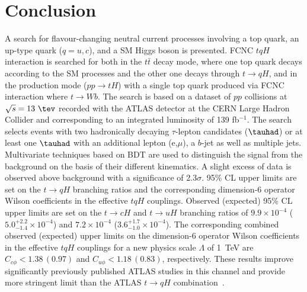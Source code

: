 \section{Conclusion}
\label{sec:conclusion}
A search for flavour-changing neutral current processes involving a top quark, an up-type quark ($q=u, c$), and a SM Higgs boson is presented. FCNC $tqH$ interaction is searched for both in the $t\bar{t}$ decay mode, where one top quark decays according to the SM processes and the other one decays through $t\rightarrow qH$, and in the production mode ($pp\rightarrow tH$) with a single top quark produced via FCNC interaction where $t\to Wb$. The search is based on a dataset of $pp$ collisions at $\sqrt{s}=13~\tev$ recorded with the ATLAS detector at the CERN Large Hadron Collider and corresponding to an integrated luminosity of 139 fb$^{-1}$. The search selects events with two hadronically decaying $\tau$-lepton candidates ($\tauhad$) or at least one $\tauhad$ with an additional lepton (e,$\mu$), a $b$-jet as well as multiple jets. Multivariate techniques based on BDT are used to distinguish the signal from the background on the basis of their different kinematics.
A slight excess of data is observed above background with a significance of 2.3$\sigma$.  
95\% CL upper limits are set on the $t\to qH$ branching ratios and the corresponding
dimension-6 operator Wilson coefficients in the effective $tqH$ couplings. 
Observed (expected) 95\% CL upper limits are set on the $t\to cH$ and $t\to uH$ branching ratios of $9.9\times10^{-4}$ ($5.0^{+2.2}_{-1.4}\times10^{-4}$) and $7.2\times10^{-4}$ ($3.6^{+1.7}_{-1.0}\times10^{-4}$).
The corresponding combined observed (expected) upper limits on the dimension-6 operator Wilson coefficients in
the effective $tqH$ couplings for a new physics scale $\Lambda$ of 1~TeV are $C_{c\phi} <1.38\, (0.97)$ and $C_{u\phi} <1.18\, (0.83)$, respectively.
These results improve significantly previously published ATLAS studies in this channel and provide more stringent limit than the ATLAS  $t\rightarrow qH$ combination~\cite{fcnc36}.
